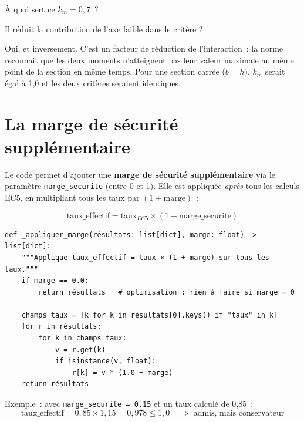 \documentclass[12pt, a4paper, openany]{book}
\newcommand{\py}[1]{\texttt{#1}}
\newcommand{\fichier}[1]{\texttt{\textit{#1}}}
\begin{document}
\begin{maitre}
\`A quoi sert ce $k_m = 0{,}7$~?
\end{maitre}

\begin{apprenti}
Il r\'eduit la contribution de l'axe faible dans le crit\`ere ?
\end{apprenti}

\begin{maitre}
Oui, et inversement. C'est un facteur de r\'eduction de l'interaction~:
la norme reconnait que les deux moments n'atteignent pas leur valeur maximale
au m\^eme point de la section en m\^eme temps.
Pour une section carr\'ee ($b = h$), $k_m$ serait \'egal \`a 1{,}0
et les deux crit\`eres seraient identiques.
\end{maitre}

\section{La marge de s\'ecurit\'e suppl\'ementaire}

Le code permet d'ajouter une \textbf{marge de s\'ecurit\'e suppl\'ementaire}
via le param\`etre \py{marge\_securite} (entre 0 et 1).
Elle est appliqu\'ee \emph{apr\`es} tous les calculs EC5,
en multipliant tous les taux par $(1 + \text{marge})$~:

\begin{equation}
\text{taux\_effectif} = \text{taux}_{EC5} \times (1 + \text{marge\_securite})
\end{equation}

\begin{lstlisting}[style=python, caption={\fichier{moteur.py} --- application de la marge de sécurité (EF-026)}]
def _appliquer_marge(résultats: list[dict], marge: float) -> list[dict]:
    """Applique taux_effectif = taux × (1 + marge) sur tous les taux."""
    if marge == 0.0:
        return résultats   # optimisation : rien à faire si marge = 0

    champs_taux = [k for k in résultats[0].keys() if "taux" in k]
    for r in résultats:
        for k in champs_taux:
            v = r.get(k)
            if isinstance(v, float):
                r[k] = v * (1.0 + marge)
    return résultats
\end{lstlisting}

Exemple~: avec \py{marge\_securite = 0.15} et un taux calcul\'e de 0{,}85~:
\[
\text{taux\_effectif} = 0{,}85 \times 1{,}15 = 0{,}978 \leq 1{,}0
\quad \Rightarrow \text{ admis, mais conservateur}
\]
\end{document}
